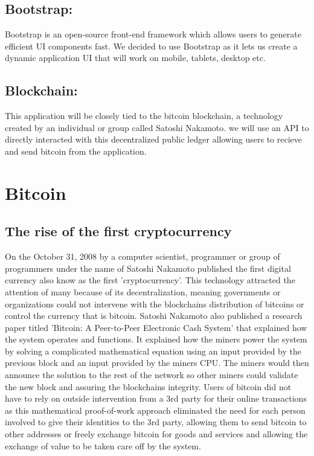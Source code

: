 \subsection{Bootstrap:}
Bootstrap is an open-source front-end framework which allows users to generate efficient UI components fast. We decided to use Bootstrap as it lets us create a dynamic application UI that will work on mobile, tablets, desktop etc.

\subsection{Blockchain:}
This application will be closely tied to the bitcoin blockchain, a technology created by an individual or group called Satoshi Nakamoto. we will use an API to directly interacted with this decentralized public ledger allowing users to recieve and send bitcoin from the application.

\section{Bitcoin}
\subsection{The rise of the first cryptocurrency}
On the October 31, 2008 by a computer scientist, programmer or group of programmers under the name of Satoshi Nakamoto published the first digital currency also know as the first 'cryptocurrency'. This technology attracted the attention of many because of its decentralization, meaning governments or organizations could not intervene with the blockchains distribution of bitcoins or control the currency that is bitcoin. Satoshi Nakamoto also published a research paper titled \cite{Satoshi}'Bitcoin: A Peer-to-Peer Electronic Cash System' that explained how the system operates and functions. It explained how the miners power the system by solving a complicated mathematical equation using an input provided by the previous block and an input provided by the miners CPU. The miners would then announce the solution to the rest of the network so other miners could validate the new block and assuring the blockchains integrity. Users of bitcoin did not have to rely on outside intervention from a 3rd party for their online transactions as this mathematical proof-of-work approach eliminated the need for each person involved to give their identities to the 3rd party, allowing them to send bitcoin to other addresses or freely exchange bitcoin for goods and services and allowing the exchange of value to be taken care off by the system.

